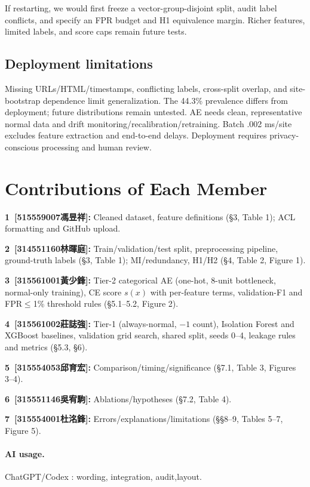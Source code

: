\documentclass[11pt]{article}
\begin{document}
If restarting, we would first freeze a vector-group-disjoint split, audit label conflicts, and specify an FPR budget and H1 equivalence margin. Richer features, limited labels, and score caps remain future tests.

\subsection{Deployment limitations}
Missing URLs/HTML/timestamps, conflicting labels, cross-split overlap, and site-bootstrap dependence limit generalization. The 44.3\% prevalence differs from deployment; future distributions remain untested. AE needs clean, representative normal data and drift monitoring/recalibration/retraining. Batch .002 ms/site excludes feature extraction and end-to-end delays. Deployment requires privacy-conscious processing and human review.

\par\medskip\noindent\begin{minipage}{\columnwidth}
\section*{Contributions of Each Member}
\begingroup\raggedright\fontsize{9}{10.5}\selectfont
\setlength{\parskip}{0pt}
\noindent\textbf{\mbox{1 [515559007馮昱祥]:}} Cleaned dataset, feature definitions (\S3, Table 1); ACL formatting and GitHub upload.\par
\noindent\textbf{\mbox{2 [314551160林暉庭]:}} Train/validation/test split, preprocessing pipeline, ground-truth labels (\S3, Table 1); MI/redundancy, H1/H2 (\S4, Table 2, Figure 1).\par
\noindent\textbf{\mbox{3 [315561001黃少鋒]:}} Tier-2 categorical AE (one-hot, 8-unit bottleneck, normal-only training), CE score $s(x)$ with per-feature terms, validation-F1 and FPR$\le$1\% threshold rules (\S5.1--5.2, Figure 2).\par
\noindent\textbf{\mbox{4 [315561002莊誌強]:}} Tier-1 (always-normal, $-1$ count), Isolation Forest and XGBoost baselines, validation grid search, shared split, seeds 0--4, leakage rules and metrics (\S5.3, \S6).\par
\noindent\textbf{\mbox{5 [315554053邱育宏]:}} Comparison/timing/significance (\S7.1, Table 3, Figures 3--4).\par
\noindent\textbf{\mbox{6 [315551146吳宥駒]:}} Ablations/hypotheses (\S7.2, Table 4).\par
\noindent\textbf{\mbox{7 [315554001杜洺鋒]:}} Errors/explanations/limitations (\S\S8--9, Tables 5--7, Figure 5).\par
\endgroup
\paragraph{AI usage.} ChatGPT/Codex : wording, integration,  audit,layout.
\end{minipage}\par
\clearpage
\end{document}
